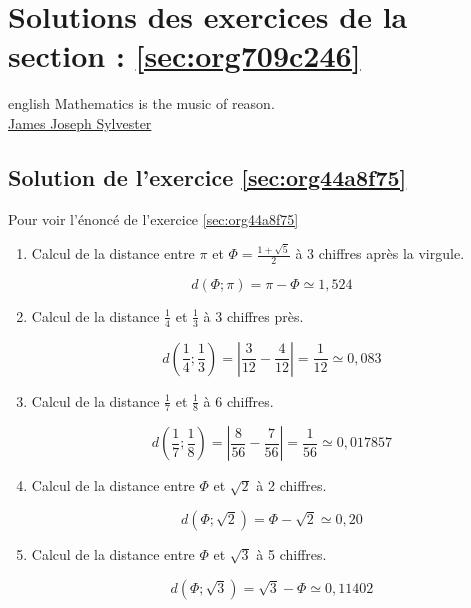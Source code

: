 \documentclass[a4paper, 11pt, twoside]{book}
\begin{document}
\chapter{Solutions des exercices de la section : \ref{sec:org709c246}}
\label{sec:orgfa5829f}
\startcontents[level-2]

\begin{foreigndisplayquote}{english}
Mathematics is the music of reason.\\

\href{https://en.wikipedia.org/wiki/James\_Joseph\_Sylvester}{James Joseph Sylvester}
\end{foreigndisplayquote}

\section{Solution de l'exercice \ref{sec:org44a8f75}}
\label{sec:org8dea703}
Pour voir l'énoncé de l'exercice \ref{sec:org44a8f75}

\begin{enumerate}
\item Calcul de la distance entre \(\pi\) et \(\Phi = \frac{1 +
       \sqrt{5}}{2}\) à 3 chiffres après la virgule.

\[d(\Phi ; \pi) = \pi - \Phi \simeq 1,524\]

\item Calcul de la distance \(\frac{1}{4}\) et \(\frac{1}{3}\) à 3
chiffres près.

\[d\left(\frac{1}{4} ; \frac{1}{3}\right) =
       \left\lvert\frac{3}{12} - \frac{4}{12}\right\rvert =
       \frac{1}{12} \simeq 0,083\]

\item Calcul de la distance \(\frac{1}{7}\) et \(\frac{1}{8}\) à 6
chiffres.

\[d\left(\frac{1}{7} ; \frac{1}{8}\right) =
       \left\lvert\frac{8}{56} - \frac{7}{56}\right\rvert =
       \frac{1}{56} \simeq 0,017857\]

\item Calcul de la distance entre \(\Phi\) et \(\sqrt{2}\) à 2 chiffres.

\[d\left(\Phi ; \sqrt{2}\right) = \Phi - \sqrt{2} \simeq 0,20\]

\item Calcul de la distance entre \(\Phi\) et \(\sqrt{3}\) à 5 chiffres.

\[d\left(\Phi ; \sqrt{3}\right) = \sqrt{3} - \Phi \simeq 0,11402\]
\end{enumerate}
\end{document}
